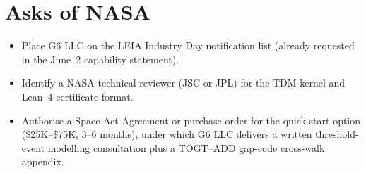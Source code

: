 \documentclass[11pt,a4paper]{article}
\begin{document}
\section{Asks of NASA}

\begin{itemize}
  \item Place G6 LLC on the LEIA Industry Day notification list
    (already requested in the June~2 capability statement).
  \item Identify a NASA technical reviewer (JSC or JPL) for the TDM
    kernel and Lean~4 certificate format.
  \item Authorise a Space Act Agreement or purchase order for the
    quick-start option (\$25K--\$75K, 3--6 months), under which G6 LLC
    delivers a written threshold-event modelling consultation plus a
    TOGT--ADD gap-code cross-walk appendix.
\end{itemize}
\end{document}
